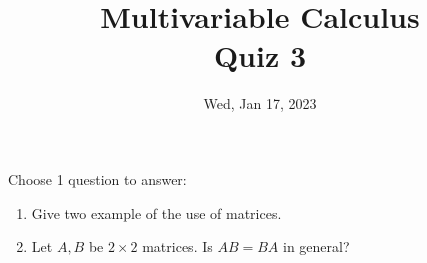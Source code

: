 \documentclass[aspectratio=169]{beamer}
\title{ Multivariable Calculus \\ Quiz 3}
\institute{Fulbright University Vietnam}
\date{Wed, Jan 17, 2023}
\begin{document}
\maketitle

\begin{frame}
    Choose 1 question to answer:
    \begin{enumerate}
        \item Give two example of the use of matrices.
        \item Let $A, B$ be $2\times 2$ matrices. 
            Is $AB = BA$ in general?
    \end{enumerate}
\end{frame}
\end{document}
